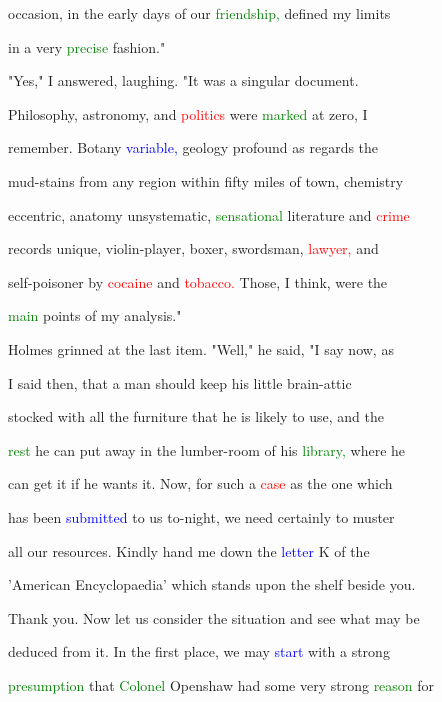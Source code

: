  occasion, in the early days of our \textcolor{green}{friendship,} defined my limits

 in a very \textcolor{green}{precise} fashion."



 "Yes," I answered, \textcolor{BurntOrange}{laughing.} "It was a singular document.

 Philosophy, astronomy, and \textcolor{red}{politics} were \textcolor{green}{marked} at zero, I

 remember. Botany \textcolor{blue}{variable,} geology profound as regards the

 mud-stains from any region within fifty miles of town, chemistry

 eccentric, anatomy unsystematic, \textcolor{green}{sensational} literature and \textcolor{red}{crime}

 records \textcolor{BurntOrange}{unique,} violin-player, boxer, swordsman, \textcolor{red}{lawyer,} and

 self-poisoner by \textcolor{red}{cocaine} and \textcolor{red}{tobacco.} Those, I think, were the

 \textcolor{green}{main} points of my analysis."



 Holmes \textcolor{BurntOrange}{grinned} at the last item. "Well," he said, "I say now, as

 I said then, that a man should keep his little brain-attic

 stocked with all the furniture that he is likely to use, and the

 \textcolor{green}{rest} he can put away in the lumber-room of his \textcolor{green}{library,} where he

 can get it if he wants it. Now, for such a \textcolor{red}{case} as the one which

 has been \textcolor{blue}{submitted} to us to-night, we need certainly to muster

 all our resources. Kindly hand me down the \textcolor{blue}{letter} K of the

 'American Encyclopaedia' which stands upon the shelf beside you.

 Thank you. Now let us consider the situation and see what may be

 deduced from it. In the first place, we may \textcolor{blue}{start} with a strong

 \textcolor{green}{presumption} that \textcolor{green}{Colonel} Openshaw had some very strong \textcolor{green}{reason} for

